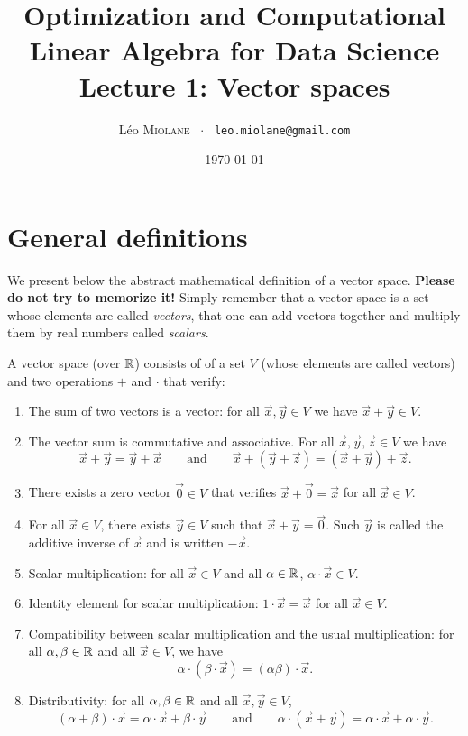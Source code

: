 \documentclass[11pt,nocut]{article}
\title{\vspace{-2.0cm}%
	Optimization and Computational Linear Algebra for Data Science\\
Lecture 1: Vector spaces}
\author{Léo \textsc{Miolane} \ $\cdot$ \ \texttt{leo.miolane@gmail.com}}
\date{\today}
\begin{document}
\maketitle

\section{General definitions}

We present below the abstract mathematical definition of a vector space. 
\textbf{Please do not try to memorize it!} 
Simply remember that a vector space is a set whose elements are called \emph{vectors}, that one can add vectors together and multiply them by real numbers called \emph{scalars}.
\begin{definition}
	A vector space (over $\mathbb{R}$) consists of of a set $V$ (whose elements are called vectors) and two operations $+$ and $\cdot$ that verify:
	\begin{enumerate}
		\item The sum of two vectors is a vector: for all $\vec{x},\vec{y} \in V$ we have $\vec{x}+\vec{y} \in V$.
		\item The vector sum is commutative and associative. For all $\vec{x},\vec{y},\vec{z} \in V$ we have
			$$
			\vec{x}+\vec{y} = \vec{y} + \vec{x} \qquad \text{and} \qquad \vec{x} + (\vec{y} + \vec{z}) = (\vec{x}+\vec{y}) + \vec{z}.
			$$
		\item There exists a zero vector $\vec{0} \in V$ that verifies $\vec{x} + \vec{0} = \vec{x}$ for all $\vec{x} \in V$.
		\item For all $\vec{x} \in V$, there exists $\vec{y} \in V$ such that $\vec{x} + \vec{y} = \vec{0}$. Such $\vec{y}$ is called the additive inverse of $\vec{x}$ and is written $- \vec{x}$.
		\item Scalar multiplication: for all $\vec{x} \in V$ and all $\alpha \in \mathbb{R}$, $\alpha \cdot \vec{x} \in V$.
		\item Identity element for scalar multiplication: $1 \cdot \vec{x} = \vec{x}$ for all $\vec{x} \in V$.
		\item Compatibility between scalar multiplication and the usual multiplication: for all $\alpha,\beta \in \mathbb{R}$ and all $\vec{x} \in V$, we have
			$$
			\alpha \cdot(\beta \cdot \vec{x}) = (\alpha \beta) \cdot \vec{x}.
			$$
		\item Distributivity: for all $\alpha,\beta \in \mathbb{R}$ and all $\vec{x},\vec{y} \in V$,
			$$
			(\alpha + \beta) \cdot \vec{x} = \alpha \cdot \vec{x} + \beta \cdot \vec{y}
			\qquad \text{and} \qquad
			\alpha \cdot (\vec{x} + \vec{y}) = \alpha \cdot \vec{x} + \alpha \cdot \vec{y}.
			$$
	\end{enumerate}
\end{definition}
\end{document}

